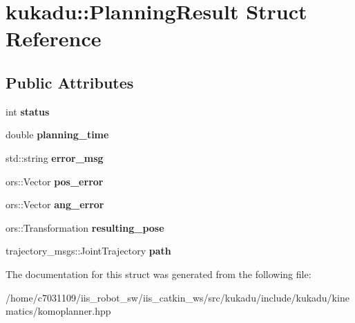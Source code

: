 \hypertarget{structkukadu_1_1PlanningResult}{\section{kukadu\-:\-:Planning\-Result Struct Reference}
\label{structkukadu_1_1PlanningResult}
}
\subsection*{Public Attributes}
\begin{DoxyCompactItemize}
\item 
\hypertarget{structkukadu_1_1PlanningResult_a238a84bbd998d9b3701bf666ac5d8ba6}{int {\bfseries status}}\label{structkukadu_1_1PlanningResult_a238a84bbd998d9b3701bf666ac5d8ba6}

\item 
\hypertarget{structkukadu_1_1PlanningResult_a02103729c4ffc12165da119ae579b031}{double {\bfseries planning\-\_\-time}}\label{structkukadu_1_1PlanningResult_a02103729c4ffc12165da119ae579b031}

\item 
\hypertarget{structkukadu_1_1PlanningResult_a7ed78dad65f83f599bea93dca3e8b6ed}{std\-::string {\bfseries error\-\_\-msg}}\label{structkukadu_1_1PlanningResult_a7ed78dad65f83f599bea93dca3e8b6ed}

\item 
\hypertarget{structkukadu_1_1PlanningResult_a7617e4928b2693f13710b188bd1bbee7}{ors\-::\-Vector {\bfseries pos\-\_\-error}}\label{structkukadu_1_1PlanningResult_a7617e4928b2693f13710b188bd1bbee7}

\item 
\hypertarget{structkukadu_1_1PlanningResult_abba70d0ec526a5f046e576a9957deb3c}{ors\-::\-Vector {\bfseries ang\-\_\-error}}\label{structkukadu_1_1PlanningResult_abba70d0ec526a5f046e576a9957deb3c}

\item 
\hypertarget{structkukadu_1_1PlanningResult_a257086a8a6f9b7f60ef13c7e292ef49e}{ors\-::\-Transformation {\bfseries resulting\-\_\-pose}}\label{structkukadu_1_1PlanningResult_a257086a8a6f9b7f60ef13c7e292ef49e}

\item 
\hypertarget{structkukadu_1_1PlanningResult_af28ca675c81bfef28c15082fcc742053}{trajectory\-\_\-msgs\-::\-Joint\-Trajectory {\bfseries path}}\label{structkukadu_1_1PlanningResult_af28ca675c81bfef28c15082fcc742053}

\end{DoxyCompactItemize}


The documentation for this struct was generated from the following file\-:\begin{DoxyCompactItemize}
\item 
/home/c7031109/iis\-\_\-robot\-\_\-sw/iis\-\_\-catkin\-\_\-ws/src/kukadu/include/kukadu/kinematics/komoplanner.\-hpp\end{DoxyCompactItemize}
